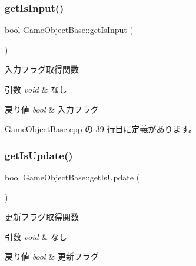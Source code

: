 \mbox{\label{class_game_object_base_ad89288cb66472324b9afc39a3afb1c2f}} 
\subsubsection{\texorpdfstring{get\+Is\+Input()}{getIsInput()}}
{\footnotesize\ttfamily bool Game\+Object\+Base\+::get\+Is\+Input (\begin{DoxyParamCaption}{ }\end{DoxyParamCaption})}



入力フラグ取得関数 


\begin{DoxyParams}{引数}
{\em void} & なし \\
\hline
\end{DoxyParams}

\begin{DoxyRetVals}{戻り値}
{\em bool} & 入力フラグ \\
\hline
\end{DoxyRetVals}


 Game\+Object\+Base.\+cpp の 39 行目に定義があります。

\mbox{\label{class_game_object_base_a424c78f66de1b6d7ab47633cdd5e90f0}} 
\subsubsection{\texorpdfstring{get\+Is\+Update()}{getIsUpdate()}}
{\footnotesize\ttfamily bool Game\+Object\+Base\+::get\+Is\+Update (\begin{DoxyParamCaption}{ }\end{DoxyParamCaption})}



更新フラグ取得関数 


\begin{DoxyParams}{引数}
{\em void} & なし \\
\hline
\end{DoxyParams}

\begin{DoxyRetVals}{戻り値}
{\em bool} & 更新フラグ \\
\hline
\end{DoxyRetVals}


